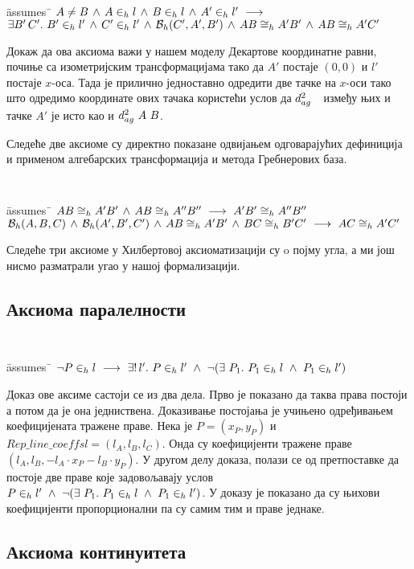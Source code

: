 {\tt
\begin{tabbing}
\hspace{5mm}\=assumes\ \=\kill
$A \neq B\,\wedge\,\inh{A}{l}\,\wedge\,\inh{B}{l}\,\wedge\,\inh{A'}{l'}\ \longrightarrow$\\
\> $\exists B'\, C'.\ \inh{B'}{l'}\,\wedge\,\inh{C'}{l'}\,\wedge\,\beth{C'}{A'}{B'}\,\wedge\,\congrh{A}{B}{A'}{B'}\,\wedge\,\congrh{A}{B}{A'}{C'}$
\end{tabbing}
}

Докаж да ова аксиома важи у нашем моделу Декартове координатне равни,
почиње са изометријским трансформацијама тако да $A'$ постаје $(0, 0)$
и $l'$ постаје $x$-оса. Тада је прилично једноставно одредити две
тачке на $x$-оси тако што одредимо координате ових тачака користећи
услов да $d^2_{ag}\ \ $ између њих и тачке $A'$ је исто као и
$d^2_{ag}\ A\ B$.

Следеће две аксиоме су директно показане одвијањем одговарајућих
дефиниција и применом алгебарских трансформација и метода Гребнерових
база.

{\tt
\begin{tabbing}
\hspace{5mm}\=assumes\ \=\kill
$\congrh{A}{B}{A'}{B'}\,\wedge\,\congrh{A}{B}{A''}{B''}\ \longrightarrow\ \congrh{A'}{B'}{A''}{B''}$\\
$\mathcal{B}_h(A, B, C)\,\wedge\,\mathcal{B}_h(A', B', C')\,\wedge\,AB \cong_h A'B'\,\wedge\,BC \cong_h B'C' \ \longrightarrow\ AC \cong_h A'C'$
\end{tabbing}
}

Следеће три аксиоме у Хилбертовој аксиоматизацији су o појму угла, а
ми још нисмо разматрали угао у нашој формализацији.

\subsection{Аксиома паралелности}

{\tt
\begin{tabbing}
\hspace{5mm}\=assumes\ \=\kill
$\neg \inh{P}{l} \ \longrightarrow\ \exists!\,l'.\ \inh{P}{l'}\ \wedge\ \neg (\exists\ P_1.\ \inh{P_1}{l}\ \wedge\  \inh{P_1}{l'})$
\end{tabbing}
}

Доказ ове аксиме састоји се из два дела. Прво је показано да таква
права постоји а потом да је она једниствена. Доказивање постојања је
учињено одређивањем коефицијената тражене праве. Нека је $P = (x_P,
y_P)$ и $\mathit{Rep\_line\_coeffs} l = (l_A, l_B, l_C)$. Онда су
коефицијенти тражене праве $(l_A, l_B, -l_A\cdot x_P - l_B\cdot
y_P)$. У другом делу доказа, полази се од претпоставке да постоје две
праве које задовољавају услов $P \in_h l'\ \wedge\ \neg
(\exists\ P_1.\ P_1 \in_h l\ \wedge\ P_1 \in_h l')$. У доказу је
показано да су њихови коефицијенти пропорционални па су самим тим и
праве једнаке.

\subsection{Аксиома континуитета}
